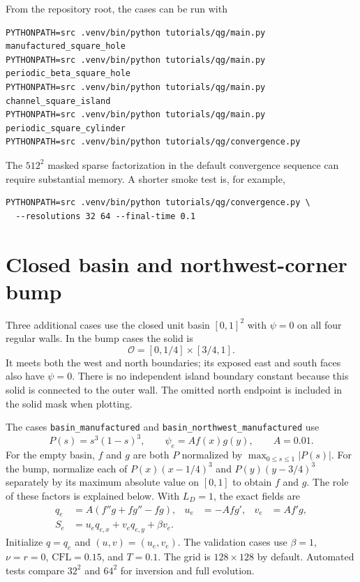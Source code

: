 \documentclass[11pt]{article}
\newcommand{\Oh}{\mathcal{O}}
\begin{document}
From the repository root, the cases can be run with
\begin{verbatim}
PYTHONPATH=src .venv/bin/python tutorials/qg/main.py manufactured_square_hole
PYTHONPATH=src .venv/bin/python tutorials/qg/main.py periodic_beta_square_hole
PYTHONPATH=src .venv/bin/python tutorials/qg/main.py channel_square_island
PYTHONPATH=src .venv/bin/python tutorials/qg/main.py periodic_square_cylinder
PYTHONPATH=src .venv/bin/python tutorials/qg/convergence.py
\end{verbatim}

The $512^2$ masked sparse factorization in the default convergence sequence
can require substantial memory.  A shorter smoke test is, for example,
\begin{verbatim}
PYTHONPATH=src .venv/bin/python tutorials/qg/convergence.py \
  --resolutions 32 64 --final-time 0.1
\end{verbatim}

\section{Closed basin and northwest-corner bump}

Three additional cases use the closed unit basin $[0,1]^2$ with
$\psi=0$ on all four regular walls.  In the bump cases the solid is
\[
  \Oh=[0,1/4]\times[3/4,1].
\]
It meets both the west and north boundaries; its exposed east and south
faces also have $\psi=0$.  There is no independent island boundary constant
because this solid is connected to the outer wall.  The omitted north
endpoint is included in the solid mask when plotting.

The cases \texttt{basin\_manufactured} and
\texttt{basin\_northwest\_manufactured} use
\[
 P(s)=s^3(1-s)^3,\qquad
 \psi_e=A f(x)g(y),\qquad A=0.01.
\]
For the empty basin, $f$ and $g$ are both $P$ normalized by
$\max_{0\le s\le1}|P(s)|$.  For the bump, normalize each of
$P(x)(x-1/4)^3$ and $P(y)(y-3/4)^3$ separately by its maximum
absolute value on $[0,1]$ to obtain $f$ and $g$.
The role of these factors is explained below.
With $L_D=1$, the exact fields are
\begin{align}
 q_e&=A(f''g+fg''-fg),&
 u_e&=-Afg',&v_e&=Af'g,\\
 S_e&=u_e q_{e,x}+v_e q_{e,y}+\beta v_e.
\end{align}
Initialize $q=q_e$ and $(u,v)=(u_e,v_e)$.  The validation cases use
$\beta=1$, $\nu=r=0$, $\mathrm{CFL}=0.15$, and $T=0.1$.
The grid is $128\times128$ by default.  Automated tests compare
$32^2$ and $64^2$ for inversion and full evolution.
\end{document}
